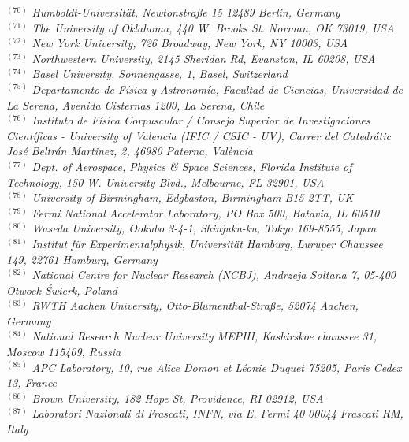 {\begin{center}
$^{(70)}$ \emph{Humboldt-Universit\"at, Newtonstra\ss e 15 12489 Berlin, Germany}\\
$^{(71)}$ \emph{The University of Oklahoma, 440 W. Brooks St. Norman, OK 73019, USA}\\
$^{(72)}$ \emph{New York University, 726 Broadway, New York, NY 10003, USA}\\
$^{(73)}$ \emph{Northwestern University, 2145 Sheridan Rd, Evanston, IL 60208, USA}\\
$^{(74)}$ \emph{Basel University, Sonnengasse, 1, Basel, Switzerland}\\
$^{(75)}$ \emph{Departamento de F\' isica y Astronom\' ia, Facultad de Ciencias, Universidad de La Serena,  Avenida Cisternas 1200, La Serena, Chile}\\
$^{(76)}$ \emph{Instituto de F\'isica Corpuscular / Consejo Superior de Investigaciones Cient\'ificas - University of Valencia (IFIC / CSIC - UV), Carrer del Catedr\'atic Jos\'e Beltr\'an Martinez, 2, 46980 Paterna, Val\`encia}\\
$^{(77)}$ \emph{Dept. of Aerospace, Physics \& Space Sciences, Florida Institute of Technology, 150 W. University Blvd., Melbourne, FL 32901, USA}\\
$^{(78)}$ \emph{University of Birmingham, Edgbaston, Birmingham B15 2TT, UK}\\
$^{(79)}$ \emph{Fermi National Accelerator Laboratory, PO Box 500, Batavia, IL 60510}\\
$^{(80)}$ \emph{Waseda University, Ookubo 3-4-1, Shinjuku-ku, Tokyo 169-8555, Japan}\\
$^{(81)}$ \emph{Institut f\"ur Experimentalphysik, Universit\"at Hamburg, Luruper Chaussee 149, 22761 Hamburg, Germany}\\
$^{(82)}$ \emph{National Centre for Nuclear Research (NCBJ), Andrzeja So\l{}tana 7, 05-400 Otwock-\'Swierk, Poland}\\
$^{(83)}$ \emph{RWTH Aachen University, Otto-Blumenthal-Stra\ss e, 52074 Aachen, Germany}\\
$^{(84)}$ \emph{National Research Nuclear University MEPHI,  Kashirskoe chaussee 31, Moscow 115409, Russia}\\
$^{(85)}$ \emph{APC Laboratory, 10, rue Alice Domon et L\'eonie Duquet 75205, Paris Cedex 13, France}\\
$^{(86)}$ \emph{Brown University, 182 Hope St, Providence, RI 02912, USA}\\
$^{(87)}$ \emph{Laboratori Nazionali di Frascati, INFN, via E. Fermi 40 00044 Frascati RM, Italy}\\

\end{center}}
